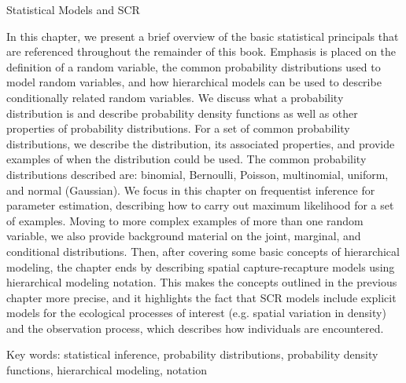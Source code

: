 Statistical Models and SCR

In this chapter, we present a brief overview of the basic statistical
principals that are referenced throughout the remainder of this
book. Emphasis is placed on the definition of a random variable, the
common probability distributions used to model random variables, and
how hierarchical models can be used to describe conditionally related
random variables.  We discuss what a probability distribution is and
describe probability density functions as well as other properties of
probability distributions.  For a set of common probability
distributions, we describe the distribution, its associated
properties, and provide examples of when the distribution could be
used.  The common probability distributions described are: binomial,
Bernoulli, Poisson, multinomial, uniform, and normal (Gaussian).  We
focus in this chapter on frequentist inference for parameter
estimation, describing how to carry out maximum likelihood for a set
of examples.  Moving to more complex examples of more than one random
variable, we also provide background material on the joint, marginal,
and conditional distributions.  Then, after covering some basic
concepts of hierarchical modeling, the chapter ends by describing
spatial capture-recapture models using hierarchical modeling
notation. This makes the concepts outlined in the previous chapter
more precise, and it highlights the fact that SCR models include
explicit models for the ecological processes of interest (e.g. spatial
variation in density) and the observation process, which describes how
individuals are encountered.

Key words: statistical inference, probability distributions, probability density functions, 
hierarchical modeling, notation 